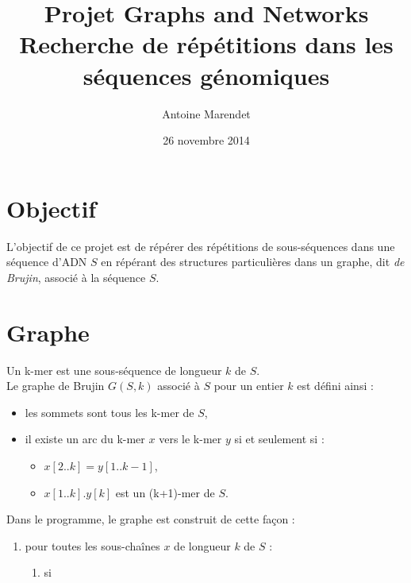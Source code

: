 \documentclass{article}
\title{Projet Graphs and Networks\\Recherche de répétitions dans les séquences génomiques}
\author{Antoine Marendet}
\date{26 novembre 2014}
\begin{document}
\maketitle

\section{Objectif}

L'objectif de ce projet est de répérer des répétitions de sous-séquences dans une séquence d'ADN $S$ en répérant des structures particulières dans un graphe, dit \textit{de Brujin}, associé à la séquence $S$.

\section{Graphe}

Un k-mer est une sous-séquence de longueur $k$ de $S$.\\
Le graphe de Brujin $G(S,k)$ associé à $S$ pour un entier $k$ est défini ainsi : 
\begin{itemize}
\item les sommets sont tous les k-mer de $S$,
\item il existe un arc du k-mer $x$ vers le k-mer $y$ si et seulement si :
\begin{itemize}
\item $x[2..k] = y[1..k-1]$,
\item $x[1..k].y[k]$ est un (k+1)-mer de $S$.
\end{itemize}
\end{itemize} 

Dans le programme, le graphe est construit de cette façon :
\begin{enumerate}
\item pour toutes les sous-chaînes $x$ de longueur $k$ de $S$ :
    \begin{enumerate}
    \item si 
    \end{enumerate}
\end{enumerate}
\end{document}
